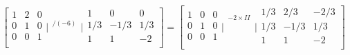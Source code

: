 $$
\left[
\begin{array}{rrr}
  1 & 2 &  0 \\
  0 & 1 & 0 \\
  0 & 0 & 1 \\
\end{array} \Bigg|
\begin{array}{l}
  _{} \\
  _{/ (-6)} \\
  _{} \\
\end{array}
\Bigg| \begin{array}{rrr}
  1 & 0 & 0 \\
  1/3 & -1/3 & 1/3 \\
  1 & 1 & -2 \\
\end{array} \right] = \left[
\begin{array}{rrr}
  1 & 0 &  0 \\
  0 & 1 & 0 \\
  0 & 0 & 1 \\
\end{array} \Bigg|
\begin{array}{l}
  _{-2 \times II} \\
  _{} \\
  _{} \\
\end{array}
\Bigg| \begin{array}{rrr}
  1/3 & 2/3 & -2/3 \\
  1/3 & -1/3 & 1/3 \\
  1 & 1 & -2 \\
\end{array} \right]
$$
